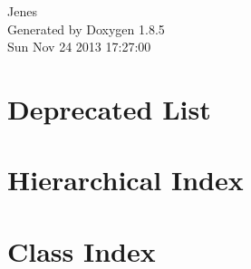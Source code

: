 \documentclass[twoside]{book}
\newcommand{\clearemptydoublepage}{%
  \newpage{\pagestyle{empty}\cleardoublepage}%
}
\begin{document}
\hypersetup{pageanchor=false}
\begin{titlepage}
\vspace*{7cm}
\begin{center}%
{\Large Jenes }\\
\vspace*{1cm}
{\large Generated by Doxygen 1.8.5}\\
\vspace*{0.5cm}
{\small Sun Nov 24 2013 17:27:00}\\
\end{center}
\end{titlepage}
\clearemptydoublepage
\tableofcontents
\clearemptydoublepage
{}
\hypersetup{pageanchor=true}

\chapter{Deprecated List}
\label{deprecated}
\hypertarget{deprecated}{}

\chapter{Hierarchical Index}

\chapter{Class Index}

\end{document}

